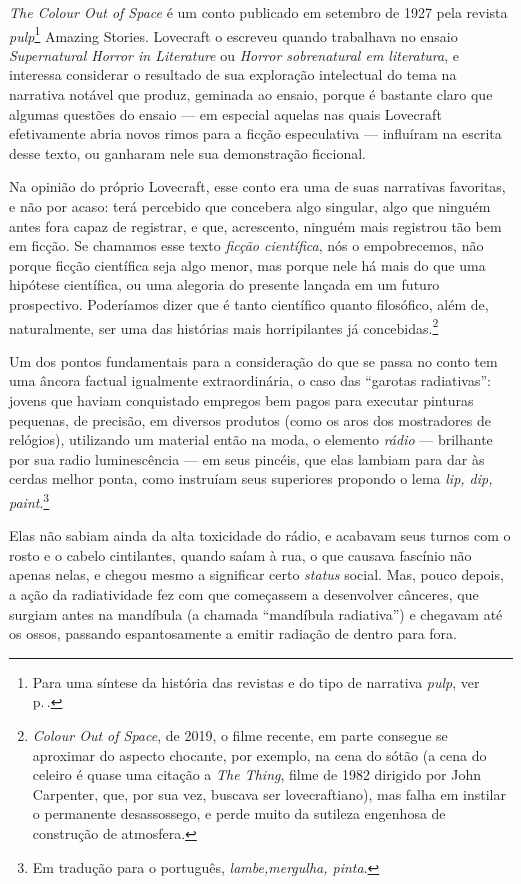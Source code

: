 \textit{The Colour Out of Space} é um conto publicado em setembro de 1927
pela revista \textit{pulp}\footnote{Para uma síntese da história das
  revistas e do tipo de narrativa \textit{pulp}, ver p.\,\pageref{pulp}.} Amazing Stories. Lovecraft o escreveu quando
trabalhava no ensaio \textit{Supernatural Horror in Literature} ou \textit{Horror
sobrenatural em literatura}, e interessa considerar o resultado de sua
exploração intelectual do tema na narrativa notável que produz, geminada
ao ensaio, porque é bastante claro que algumas questões do ensaio --- em
especial aquelas nas quais Lovecraft efetivamente abria novos rimos para
a ficção especulativa --- influíram na escrita desse texto, ou ganharam
nele sua demonstração ficcional.

Na opinião do próprio Lovecraft, esse conto era uma de suas narrativas
favoritas, e não por acaso: terá percebido que concebera algo singular,
algo que ninguém antes fora capaz de registrar, e que, acrescento,
ninguém mais registrou tão bem em ficção. Se chamamos esse texto
\textit{ficção científica}, nós o empobrecemos, não porque ficção
científica seja algo menor, mas porque nele há mais do que uma hipótese
científica, ou uma alegoria do presente lançada em um futuro
prospectivo. Poderíamos dizer que é tanto científico quanto filosófico,
além de, naturalmente, ser uma das histórias mais horripilantes já
concebidas.\footnote{\textit{Colour Out of Space}, de 2019, o filme recente,
  em parte consegue se aproximar do aspecto chocante, por exemplo, na
  cena do sótão (a cena do celeiro é quase uma citação a \textit{The
  Thing}, filme de 1982 dirigido por John Carpenter, que, por sua vez,
  buscava ser lovecraftiano), mas falha em instilar o permanente
  desassossego, e perde muito da sutileza engenhosa de construção de
  atmosfera.}

Um dos pontos fundamentais para a consideração do que se passa no conto
tem uma âncora factual igualmente extraordinária, o caso das ``garotas
radiativas'': jovens que haviam conquistado empregos bem pagos para
executar pinturas pequenas, de precisão, em diversos produtos (como os
aros dos mostradores de relógios), utilizando um material então na moda,
o elemento \textit{rádio} --- brilhante por sua radio luminescência --- em
seus pincéis, que elas lambiam para dar às cerdas melhor ponta, como
instruíam seus superiores propondo o lema \textit{lip, dip, paint}.\footnote{Em tradução para o português, \textit{lambe,mergulha, pinta}.}

Elas não sabiam ainda da alta toxicidade do rádio, e acabavam seus
turnos com o rosto e o cabelo cintilantes, quando saíam à rua, o que
causava fascínio não apenas nelas, e chegou mesmo a significar certo
\textit{status} social. Mas, pouco depois, a ação da radiatividade fez com
que começassem a desenvolver cânceres, que surgiam antes na mandíbula (a
chamada ``mandíbula radiativa'') e chegavam até os ossos, passando
espantosamente a emitir radiação de dentro para fora.

